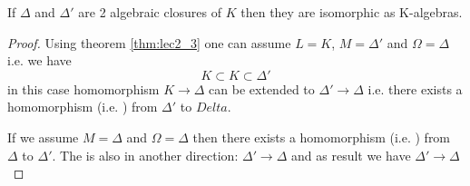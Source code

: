 \begin{corollary}
  If $\Delta$ and $\Delta'$ are 2 algebraic closures of $K$ then they
  are isomorphic as K-algebras.
  \begin{proof}
    Using theorem \ref{thm:lec2_3} one can assume
    $L = K$, $M = \Delta'$ and $\Omega = \Delta$ i.e. we have
    \[
    K \subset K \subset \Delta'
    \]
    in this case homomorphism $K \to \Delta$ can be extended to
    $\Delta' \to \Delta$ i.e. there exists a homomorphism
    (i.e. ) from $\Delta'$ to $Delta$.

    If we assume $M = \Delta$ and $\Omega = \Delta$ then there exists
    a homomorphism (i.e. ) from $\Delta$ to
    $\Delta'$. The  is also
     in another direction: $\Delta' \to
    \Delta$ and as result we have  $\Delta' \to
    \Delta$ 
  \end{proof}
\end{corollary}
